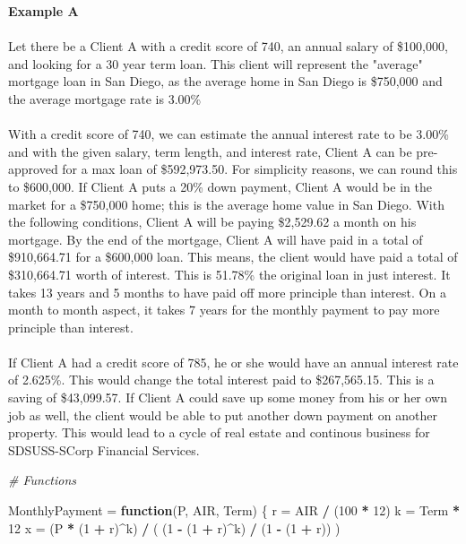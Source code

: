 \documentclass[12pt]{article}
\newenvironment{Section}[1]{}{\newpage}
\newenvironment{Shaded}{\begin{snugshade}}{\end{snugshade}}
\newcommand{\CommentTok}[1]{\textcolor[rgb]{0.56,0.35,0.01}{\textit{#1}}}
\newcommand{\ControlFlowTok}[1]{\textcolor[rgb]{0.13,0.29,0.53}{\textbf{#1}}}
\newcommand{\DecValTok}[1]{\textcolor[rgb]{0.00,0.00,0.81}{#1}}
\newcommand{\NormalTok}[1]{#1}
\newcommand{\OperatorTok}[1]{\textcolor[rgb]{0.81,0.36,0.00}{\textbf{#1}}}
\newcommand{\StringTok}[1]{\textcolor[rgb]{0.31,0.60,0.02}{#1}}
\begin{document}
	\begin{Section}{Example A}
		\textbf{\Huge Example A}
		\\ \\
		Let there be a Client A with a credit score of 740, an annual salary of \$100,000, and looking for a 30 year term loan.  This client will represent the "average" mortgage loan in San Diego, as the average home in San Diego is \$750,000 and the average mortgage rate is 3.00\%
		\\ \\
		With a credit score of 740, we can estimate the annual interest rate to be 3.00\% and with the given salary, term length, and interest rate, Client A can be pre-approved for a max loan of \$592,973.50.  For simplicity reasons, we can round this to \$600,000.  If Client A puts a 20\% down payment, Client A would be in the market for a \$750,000 home; this is the average home value in San Diego.  With the following conditions, Client A will be paying \$2,529.62 a month on his mortgage.  By the end of the mortgage, Client A will have paid in a total of \$910,664.71 for a \$600,000 loan.  This means, the client would have paid a total of \$310,664.71 worth of interest.  This is 51.78\% the original loan in just interest.  It takes 13 years and 5 months to have paid off more principle than interest.  On a month to month aspect, it takes 7 years for the monthly payment to pay more principle than interest.
		\\ \\
		If Client A had a credit score of 785, he or she would have an annual interest rate of 2.625\%.  This would change the total interest paid to \$267,565.15.  This is a saving of \$43,099.57.  If Client A could save up some money from his or her own job as well, the client would be able to put another down payment on another property.  This would lead to a cycle of real estate and continous business for SDSUSS-SCorp Financial Services.
		\newpage 
\begin{singlespace}
\begin{Shaded}
\begin{Highlighting}[]
\CommentTok{# Functions}

\NormalTok{MonthlyPayment =}\StringTok{ }\ControlFlowTok{function}\NormalTok{(P, AIR, Term) \{}
\NormalTok{  r =}\StringTok{ }\NormalTok{AIR }\OperatorTok{/}\StringTok{ }\NormalTok{(}\DecValTok{100} \OperatorTok{*}\StringTok{ }\DecValTok{12}\NormalTok{)}
\NormalTok{  k =}\StringTok{ }\NormalTok{Term }\OperatorTok{*}\StringTok{ }\DecValTok{12}
\NormalTok{  x =}\StringTok{ }\NormalTok{(P }\OperatorTok{*}\StringTok{ }\NormalTok{(}\DecValTok{1} \OperatorTok{+}\StringTok{ }\NormalTok{r)}\OperatorTok{^}\NormalTok{k) }\OperatorTok{/}\StringTok{ }\NormalTok{( (}\DecValTok{1} \OperatorTok{-}\StringTok{ }\NormalTok{(}\DecValTok{1} \OperatorTok{+}\StringTok{ }\NormalTok{r)}\OperatorTok{^}\NormalTok{k) }\OperatorTok{/}\StringTok{ }\NormalTok{(}\DecValTok{1} \OperatorTok{-}\StringTok{ }\NormalTok{(}\DecValTok{1} \OperatorTok{+}\StringTok{ }\NormalTok{r)) )}


\end{Highlighting}
\end{Shaded}
\end{singlespace}
\end{Section}
\end{document}
